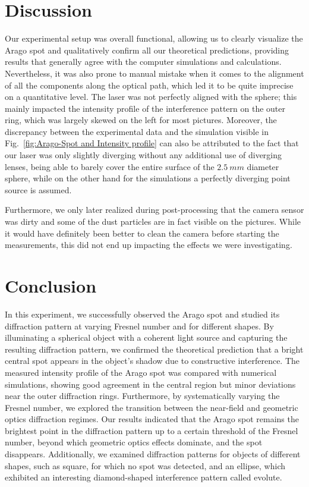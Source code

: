 \documentclass[11pt,a4paper]{article}
\begin{document}
\vspace{1px}
\section{Discussion}
Our experimental setup was overall functional, allowing us to clearly visualize the Arago spot and  qualitatively confirm all our theoretical predictions, providing results that generally agree with the computer simulations and calculations. Nevertheless, it was also prone to manual mistake when it comes to the alignment of all the components along the optical path, which led it to be quite imprecise on a quantitative level. The laser was not perfectly aligned with the sphere; this mainly impacted the intensity profile of the interference pattern on the outer ring, which was largely skewed on the left for most pictures. Moreover, the discrepancy between the experimental data and the simulation visible in Fig.~\ref{fig:Arago-Spot and Intensity profile} can also be attributed to the fact that our laser was only slightly diverging without any additional use of diverging lenses, being able to barely cover the entire surface of the \(\SI{2.5}{mm}\) diameter sphere, while on the other hand for the simulations a perfectly diverging point source is assumed. 

Furthermore, we only later realized during post-processing that the camera sensor was dirty and some of the dust particles are in fact visible on the pictures. While it would have definitely been better to clean the camera before starting the measurements, this did not end up impacting the effects we were investigating. 

\section{Conclusion}
In this experiment, we successfully observed the Arago spot and studied its diffraction pattern at varying Fresnel number and for different shapes. By illuminating a spherical object with a coherent light source and capturing the resulting diffraction pattern, we confirmed the theoretical prediction that a bright central spot appears in the object's shadow due to constructive interference. The measured intensity profile of the Arago spot was compared with numerical simulations, showing good agreement in the central region but minor deviations near the outer diffraction rings.
Furthermore, by systematically varying the Fresnel number, we explored the transition between the near-field and geometric optics diffraction regimes. Our results indicated that the Arago spot remains the brightest point in the diffraction pattern up to a certain threshold of the Fresnel number, beyond which geometric optics effects dominate, and the spot disappears. Additionally, we examined diffraction patterns for objects of different shapes, such as square, for which no spot was detected, and an ellipse, which exhibited an interesting diamond-shaped interference pattern called evolute. 
\end{document}
